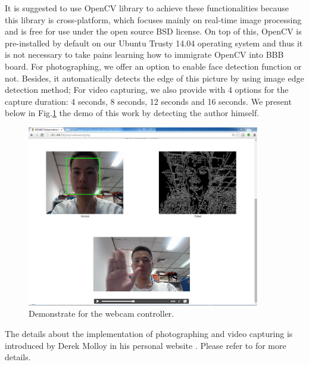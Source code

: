 \documentclass[12pt,journal,draftclsnofoot,onecolumn]{IEEEtran}
\begin{document}
It is suggested to use OpenCV library to achieve these functionalities because this library is cross-platform, which focuses mainly on real-time image processing and is free for use under the open source BSD license.
On top of this, OpenCV is pre-installed by default on our Ubuntu Trusty 14.04 operating system and thus it is not necessary to take pains learning how to immigrate OpenCV into BBB board. For photographing, we offer an option to enable face detection function or not. Besides, it automatically detects the edge of this picture by using image edge detection method;  For video capturing, we also provide with 4 options for the capture duration: 4 seconds, 8 seconds, 12 seconds and 16 seconds.  We present below in Fig.\ref{webcamdemo} the demo of this work by detecting the author himself.
\begin{figure}[htb]
	\centering
	\includegraphics[width=4in]{./figs/webcam3.PNG}
	\caption{Demonstrate for the webcam controller.}
	\label{webcamdemo}
\end{figure}

The details about the implementation of photographing and video capturing is introduced by Derek Molloy in his personal website \cite{molloy}. Please refer to \cite{molloy_videocapture,facedetection} for more details.
%
%
\end{document}
